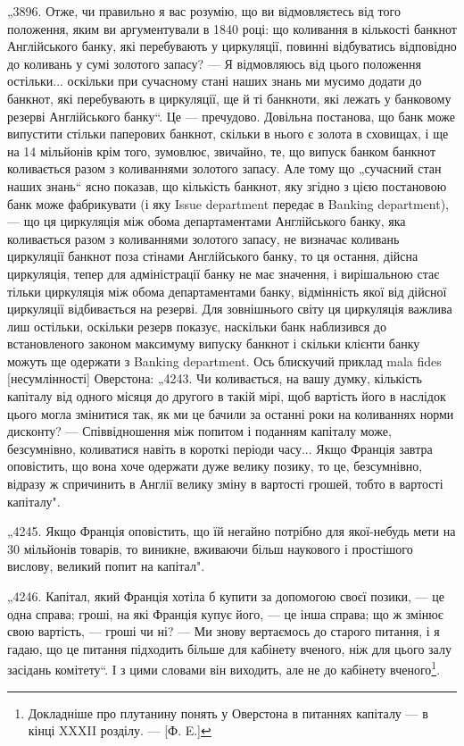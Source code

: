 „3896. Отже, чи правильно я вас розумію, що ви відмовляєтесь
від того положення, яким ви аргументували в 1840 році: що коливання в кількості банкнот Англійського
банку, які перебувають
у циркуляції, повинні відбуватись відповідно до коливань у сумі
золотого запасу? — Я відмовляюсь від цього положення остільки...
оскільки при сучасному стані наших знань ми мусимо додати до
банкнот, які перебувають в циркуляції, ще й ті банкноти, які
лежать у банковому резерві Англійського банку“. Це — пречудово. Довільна постанова, що банк може
випустити стільки
паперових банкнот, скільки в нього є золота в сховищах, і ще на
14 мільйонів крім того, зумовлює, звичайно, те, що випуск банком
банкнот коливається разом з коливаннями золотого запасу. Але
тому що „сучасний стан наших знань“ ясно показав, що кількість
банкнот, яку згідно з цією постановою банк може фабрикувати (і яку
Issue department передає в Banking department), — що ця циркуляція
між обома департаментами Англійського банку, яка коливається
разом з коливаннями золотого запасу, не визначає коливань
циркуляції банкнот поза стінами Англійського банку, то ця
остання, дійсна циркуляція, тепер для адміністрації банку не має
значення, і вирішальною стає тільки циркуляція між обома
департаментами банку, відмінність якої від дійсної циркуляції
відбивається на резерві. Для зовнішнього світу ця циркуляція
важлива лиш остільки, оскільки резерв показує, наскільки банк
наблизився до встановленого законом максимуму випуску банкнот і
скільки клієнти банку можуть ще одержати з Banking department.
Ось блискучий приклад mala fides [несумлінності] Оверстона:
„4243. Чи коливається, на вашу думку, кількість капіталу від
одного місяця до другого в такій мірі, щоб вартість його в наслідок цього могла змінитися так, як ми
це бачили за
останні роки на коливаннях норми дисконту? — Співвідношення
між попитом і поданням капіталу може, безсумнівно, коливатися навіть в короткі періоди часу... Якщо
Франція завтра оповістить, що вона хоче одержати дуже велику позику, то це, безсумнівно, відразу ж
спричинить в Англії велику зміну в вартості грошей, тобто в вартості капіталу".

„4245. Якщо Франція оповістить, що їй негайно потрібно для
якої-небудь мети на 30 мільйонів товарів, то виникне, вживаючи
більш наукового і простішого вислову, великий попит на капітал".

„4246. Капітал, який Франція хотіла б купити за допомогою
своєї позики, — це одна справа; гроші, на які Франція купує його, — це інша справа; що ж змінює свою
вартість, — гроші чи ні? — Ми знову вертаємось до старого питання, і я гадаю, що це питання
підходить більше для кабінету вченого, ніж для цього залу засідань комітету“. І з цими словами він
виходить, але не
до кабінету вченого\footnote{
Докладніше про плутанину понять у Оверстона в питаннях капіталу — в кінці XXXII розділу. — [Ф.
E.]
}.

